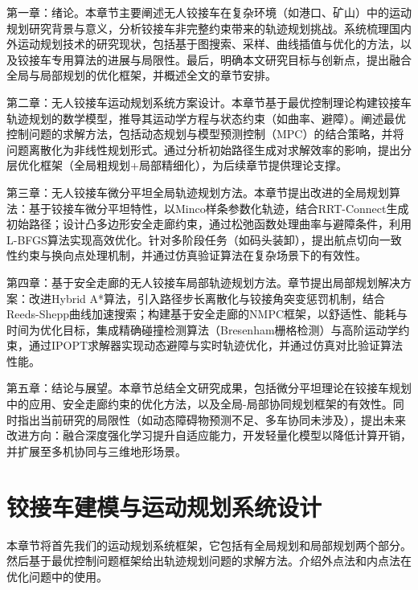 \documentclass[master,academic]{ysuthesis} %
\begin{document}
	第一章：绪论。本章节主要阐述无人铰接车在复杂环境（如港口、矿山）中的运动规划研究背景与意义，分析铰接车非完整约束带来的轨迹规划挑战。系统梳理国内外运动规划技术的研究现状，包括基于图搜索、采样、曲线插值与优化的方法，以及铰接车专用算法的进展与局限性。最后，明确本文研究目标与创新点，提出融合全局与局部规划的优化框架，并概述全文的章节安排。

	第二章：无人铰接车运动规划系统方案设计​。本章节基于最优控制理论构建铰接车轨迹规划的数学模型，推导其运动学方程与状态约束（如曲率、避障）。阐述最优控制问题的求解方法，包括动态规划与模型预测控制（MPC）的结合策略，并将问题离散化为非线性规划形式。通过分析初始路径生成对求解效率的影响，提出分层优化框架（全局粗规划+局部精细化），为后续章节提供理论支撑。

	第三章：无人铰接车微分平坦全局轨迹规划方法​。本章节提出改进的全局规划算法：基于铰接车微分平坦特性，以Minco样条参数化轨迹，结合RRT-Connect生成初始路径；设计凸多边形安全走廊约束，通过松弛函数处理曲率与避障条件，利用L-BFGS算法实现高效优化。针对多阶段任务（如码头装卸），提出航点切向一致性约束与换向点处理机制，并通过仿真验证算法在复杂场景下的有效性。

	第四章：基于安全走廊的无人铰接车局部轨迹规划方法​。章节提出局部规划解决方案：改进Hybrid A*算法，引入路径步长离散化与铰接角突变惩罚机制，结合Reeds-Shepp曲线加速搜索；构建基于安全走廊的NMPC框架，以舒适性、能耗与时间为优化目标，集成精确碰撞检测算法（Bresenham栅格检测）与高阶运动学约束，通过IPOPT求解器实现动态避障与实时轨迹优化，并通过仿真对比验证算法性能。

	第五章：结论与展望​。本章节总结全文研究成果，包括微分平坦理论在铰接车规划中的应用、安全走廊约束的优化方法，以及全局-局部协同规划框架的有效性。同时指出当前研究的局限性（如动态障碍物预测不足、多车协同未涉及），提出未来改进方向：融合深度强化学习提升自适应能力，开发轻量化模型以降低计算开销，并扩展至多机协同与三维地形场景。

	\chapter{铰接车建模与运动规划系统设计}
	本章节将首先我们的运动规划系统框架，它包括有全局规划和局部规划两个部分。然后基于最优控制问题框架给出轨迹规划问题的求解方法。介绍外点法和内点法在优化问题中的使用。
\end{document}
